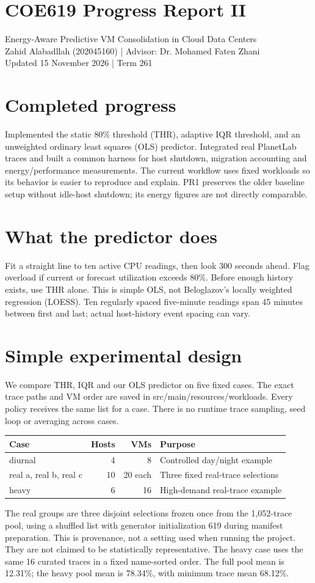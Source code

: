 \documentclass[11pt,a4paper]{article}
\begin{document}
\section*{COE619 Progress Report II}
Energy-Aware Predictive VM Consolidation in Cloud Data Centers\\
Zahid Alabadllah (202045160) | Advisor: Dr. Mohamed Faten Zhani\\
Updated 15 November 2026 | Term 261
\section{Completed progress}
Implemented the static 80\% threshold (THR), adaptive IQR threshold, and an unweighted ordinary least squares (OLS) predictor. Integrated real PlanetLab traces and built a common harness for host shutdown, migration accounting and energy/performance measurements. The current workflow uses fixed workloads so its behavior is easier to reproduce and explain. PR1 preserves the older baseline setup without idle-host shutdown; its energy figures are not directly comparable.
\section{What the predictor does}
Fit a straight line to ten active CPU readings, then look 300 seconds ahead. Flag overload if current or forecast utilization exceeds 80\%. Before enough history exists, use THR alone. This is simple OLS, not Beloglazov's locally weighted regression (LOESS). Ten regularly spaced five-minute readings span 45 minutes between first and last; actual host-history event spacing can vary.
\section{Simple experimental design}
We compare THR, IQR and our OLS predictor on five fixed cases. The exact trace paths and VM order are saved in src/main/resources/workloads. Every policy receives the same list for a case. There is no runtime trace sampling, seed loop or averaging across cases.
\begin{center}\small\begin{tabular}{lrrl}\toprule Case & Hosts & VMs & Purpose\\\midrule
diurnal & 4 & 8 & Controlled day/night example\\
real a, real b, real c & 10 & 20 each & Three fixed real-trace selections\\
heavy & 6 & 16 & High-demand real-trace example\\\bottomrule\end{tabular}\end{center}
The real groups are three disjoint selections frozen once from the 1,052-trace pool, using a shuffled list with generator initialization 619 during manifest preparation. This is provenance, not a setting used when running the project. They are not claimed to be statistically representative. The heavy case uses the same 16 curated traces in a fixed name-sorted order. The full pool mean is 12.31\%; the heavy pool mean is 78.34\%, with minimum trace mean 68.12\%.
\end{document}
